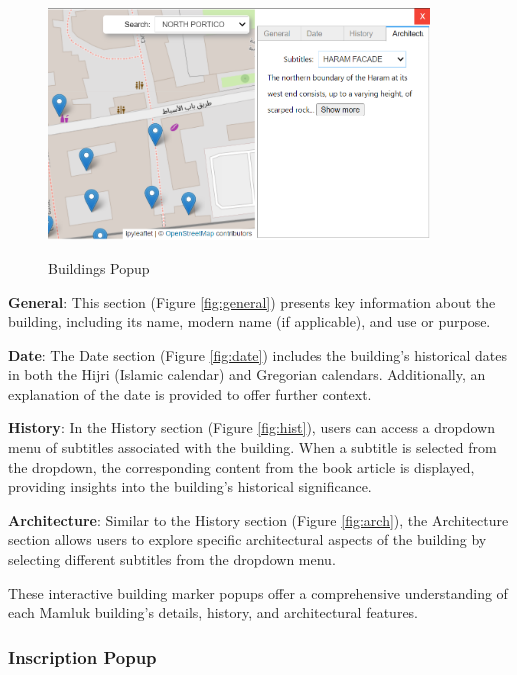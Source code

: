 \begin{figure}[H]
\begin{minipage}[c]{.5\linewidth}
        \label{fig:hist}
    \end{minipage}\hfill
    \begin{minipage}[c]{.5\linewidth}
        \centering
        \includegraphics[width=0.9\textwidth]{Images/arch.png}
        \label{fig:arch}
    \end{minipage}
    \caption{Buildings Popup}
    \label{fig:layers}
\end{figure}

\textbf{General}: This section (Figure \ref{fig:general}) presents key information about the building, including its name, modern name (if applicable), and use or purpose.

\textbf{Date}: The Date section (Figure \ref{fig:date}) includes the building's historical dates in both the Hijri (Islamic calendar) and Gregorian calendars. Additionally, an explanation of the date is provided to offer further context.

\textbf{History}: In the History section (Figure \ref{fig:hist}), users can access a dropdown menu of subtitles associated with the building. When a subtitle is selected from the dropdown, the corresponding content from the book article is displayed, providing insights into the building's historical significance.

\textbf{Architecture}: Similar to the History section (Figure \ref{fig:arch}), the Architecture section allows users to explore specific architectural aspects of the building by selecting different subtitles from the dropdown menu.

These interactive building marker popups offer a comprehensive understanding of each Mamluk building's details, history, and architectural features.

\subsubsection{Inscription Popup}

